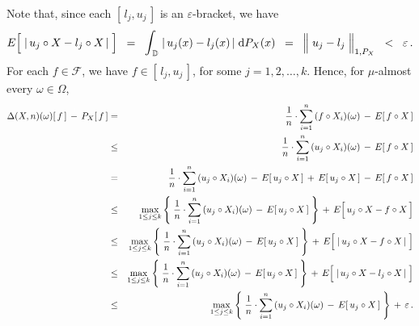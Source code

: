 Note that, since each $[\,l_{j},u_{j}\,]$ is an $\varepsilon$-bracket, we have
\begin{equation*}
E\!\left[\;\vert\, u_{j} \circ X \overset{{\color{white}.}}{-} l_{j} \circ X \,\vert\;\right]
\;\; = \;\; \mathlarger{\int}_{\,\D}\;\vert\,u_{j}(x) - l_{j}(x)\,\vert\;\d P_{X}(x)
\;\; = \;\; \left\Vert\; u_{j} \overset{{\color{white}.}}{-} l_{j} \;\right\Vert_{1,P_{X}}
\;\; < \;\; \varepsilon\,.
\end{equation*}
For each $f \in \mathcal{F}$, we have $f \in [\,l_{j},u_{j}\,]$, for some $j = 1,2,\ldots,k$.
Hence, for $\mu$-almost every $\omega\in\Omega$,
\begin{eqnarray*}
\Delta(X,n)(\omega)[\,f\,]\,\overset{{\color{white}+}}{-}\,P_{X}[\,f\,]
& = &
	\dfrac{1}{n}\cdot \overset{n}{\underset{i=1}{\sum}}\,(f \circ X_{i})(\omega)
	\,\overset{{\color{white}+}}{-}\,
	E[\,f \circ X\,]
\\
& \leq &
	\dfrac{1}{n}\cdot \overset{n}{\underset{i=1}{\sum}}\,(u_{j} \circ X_{i})(\omega)
	\,\overset{{\color{white}+}}{-}\,
	E[\,f \circ X\,]
\\
& = &
	\dfrac{1}{n}\cdot \overset{n}{\underset{i=1}{\sum}}\,(u_{j} \circ X_{i})(\omega)
	\,\overset{{\color{white}+}}{-}\,
	E[\,u_{j} \circ X\,]
	\,\overset{{\color{white}+}}{+}\,
	E[\,u_{j} \circ X\,]
	\,\overset{{\color{white}+}}{-}\,
	E[\,f \circ X\,]
\\
& \leq &
	\underset{1\leq j \leq k}{\max}\left\{\;
		\dfrac{1}{n}\cdot \overset{n}{\underset{i=1}{\sum}}\,(u_{j} \circ X_{i})(\omega)
		\,\overset{{\color{white}+}}{-}\,
		E[\,u_{j} \circ X\,]
		\;\right\}
	\,\overset{{\color{white}+}}{+}\,
	E\!\left[\, u_{j} \circ X \overset{{\color{white}.}}{-} f \circ X\,\right]
\\
& \leq &
	\underset{1\leq j \leq k}{\max}\left\{\;
		\dfrac{1}{n}\cdot \overset{n}{\underset{i=1}{\sum}}\,(u_{j} \circ X_{i})(\omega)
		\,\overset{{\color{white}+}}{-}\,
		E[\,u_{j} \circ X\,]
		\;\right\}
	\,\overset{{\color{white}+}}{+}\,
	E\!\left[\; \vert\, u_{j} \circ X \overset{{\color{white}.}}{-} f \circ X \,\vert \;\right]
\\
& \leq &
	\underset{1\leq j \leq k}{\max}\left\{\;
		\dfrac{1}{n}\cdot \overset{n}{\underset{i=1}{\sum}}\,(u_{j} \circ X_{i})(\omega)
		\,\overset{{\color{white}+}}{-}\,
		E[\,u_{j} \circ X\,]
		\;\right\}
	\,\overset{{\color{white}+}}{+}\,
	E\!\left[\; \vert\, u_{j} \circ X \overset{{\color{white}.}}{-} l_{j} \circ X \,\vert \;\right]
\\
& \leq &
	\underset{1\leq j \leq k}{\max}\left\{\;
		\dfrac{1}{n}\cdot \overset{n}{\underset{i=1}{\sum}}\,(u_{j} \circ X_{i})(\omega)
		\,\overset{{\color{white}+}}{-}\,
		E[\,u_{j} \circ X\,]
		\;\right\}
	\,\overset{{\color{white}+}}{+}\,
	\varepsilon\,.
\end{eqnarray*}
